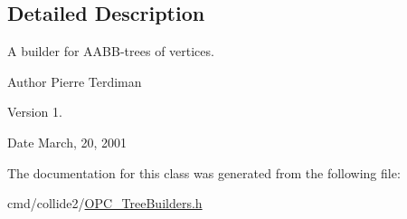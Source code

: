 \subsection{Detailed Description}
A builder for A\+A\+B\+B-\/trees of vertices.

\begin{DoxyAuthor}{Author}
Pierre Terdiman 
\end{DoxyAuthor}
\begin{DoxyVersion}{Version}
1. 
\end{DoxyVersion}
\begin{DoxyDate}{Date}
March, 20, 2001 
\end{DoxyDate}


The documentation for this class was generated from the following file\+:\begin{DoxyCompactItemize}
\item 
cmd/collide2/\hyperlink{OPC__TreeBuilders_8h}{O\+P\+C\+\_\+\+Tree\+Builders.\+h}\end{DoxyCompactItemize}

